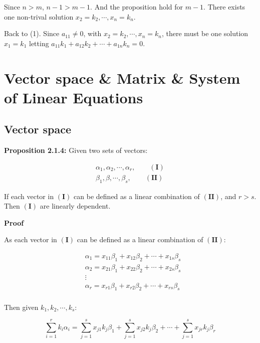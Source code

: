\documentclass{article}
\begin{document}
Since \(n>m\), \(n-1>m-1\). And the proposition hold for \(m-1\). There
exists one non-trival solution \(x_2=k_2, \cdots, x_n=k_n\).

Back to (1). Since \(a_{11} \neq 0\), with
\(x_2=k_2, \cdots, x_n=k_n\), there must be one solution \(x_1=k_1\)
letting \(a_{11}k_1+a_{12}k_2+\cdots+a_{1n}k_n=0\).

\section{Vector space \& Matrix \& System of Linear Equations}

\subsection{Vector space}

\textbf{Proposition 2.1.4:} Given two sets of vectors:

\begin{equation}
\begin{split}
    \alpha_1, \alpha_2, \cdots, \alpha_r, \quad\quad (\mathbf{I}) \\
    \beta_1, \beta, \cdots, \beta_s, \quad\quad (\mathbf{II})
\end{split}
\end{equation}

If each vector in \((\mathbf{I})\) can be defined as a linear combination
of \((\mathbf{II})\), and \(r>s\). Then \((\mathbf{I})\) are linearly dependent.

\vspace{2mm}
\textbf{Proof}

As each vector in \((\mathbf{I})\) can be defined as a linear combination
of \((\mathbf{II})\):

\begin{equation}
\begin{split}
&\alpha_1 = x_{11}\beta_1 + x_{12}\beta_2 + \cdots + x_{1s}\beta_s \\
&\alpha_2 = x_{21}\beta_1 + x_{22}\beta_2 + \cdots + x_{2s}\beta_s \\
&\vdots\\
&\alpha_r = x_{r1}\beta_1 + x_{r2}\beta_2 + \cdots + x_{rs}\beta_s \\
\end{split}
\end{equation}

Then given \(k_1, k_2, \cdots, k_s\):

\begin{equation}
\sum_{i=1}^{r}k_i\alpha_i=
\sum_{j=1}^{s}x_{j1}k_j\beta_1
+\sum_{j=1}^{s}x_{j2}k_j\beta_2
+\cdots
+\sum_{j=1}^{s}x_{jr}k_j\beta_r
\end{equation}
\end{document}
